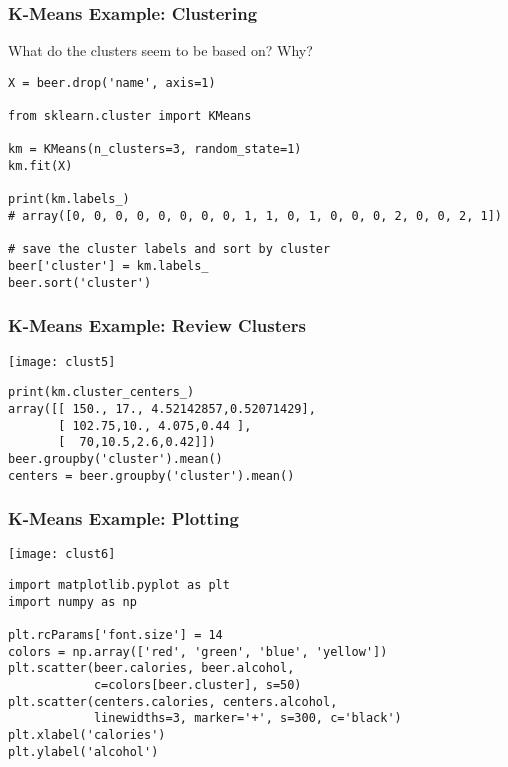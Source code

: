\begin{frame}[fragile]\frametitle{K-Means Example: Clustering}

What do the clusters seem to be based on? Why?


\begin{lstlisting}
X = beer.drop('name', axis=1)

from sklearn.cluster import KMeans

km = KMeans(n_clusters=3, random_state=1)
km.fit(X)

print(km.labels_)
# array([0, 0, 0, 0, 0, 0, 0, 0, 1, 1, 0, 1, 0, 0, 0, 2, 0, 0, 2, 1])

# save the cluster labels and sort by cluster
beer['cluster'] = km.labels_
beer.sort('cluster')
\end{lstlisting}
\end{frame}

\begin{frame}[fragile]\frametitle{K-Means Example: Review Clusters}

\begin{center}
\texttt{[image: clust5]}
\end{center}

\begin{lstlisting}
print(km.cluster_centers_)
array([[ 150., 17., 4.52142857,0.52071429],
       [ 102.75,10., 4.075,0.44 ],
       [  70,10.5,2.6,0.42]])
beer.groupby('cluster').mean()
centers = beer.groupby('cluster').mean()
\end{lstlisting}

\end{frame}

\begin{frame}[fragile]\frametitle{K-Means Example: Plotting}

\begin{center}
\texttt{[image: clust6]}
\end{center}

\begin{lstlisting}
import matplotlib.pyplot as plt
import numpy as np

plt.rcParams['font.size'] = 14
colors = np.array(['red', 'green', 'blue', 'yellow'])
plt.scatter(beer.calories, beer.alcohol, 
			c=colors[beer.cluster], s=50)
plt.scatter(centers.calories, centers.alcohol,
			linewidths=3, marker='+', s=300, c='black')
plt.xlabel('calories')
plt.ylabel('alcohol')
\end{lstlisting}

\end{frame}

